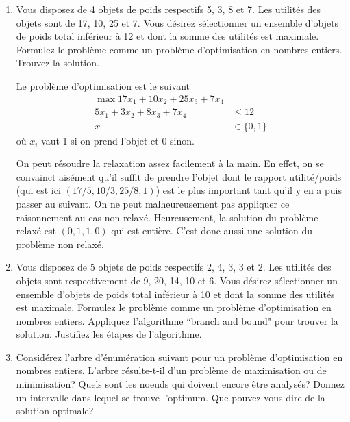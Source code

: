 \begin{enumerate}
  \item Vous disposez de 4 objets de poids respectifs 5, 3, 8 et 7. Les utilités des
    objets sont de 17, 10, 25 et 7. Vous désirez sélectionner un ensemble d'objets de poids total inférieur  à 12 et dont la somme
    des utilités est maximale.  Formulez le problème comme un problème d'optimisation en nombres entiers. Trouvez la solution.


    \begin{solution}
      Le problème d'optimisation est le suivant
      \begin{align*}
        \max 17x_1 + 10x_2 + 25x_3 + 7x_4\\
        5x_1 + 3x_2 + 8x_3 + 7x_4 & \leq 12\\
        x & \in \{0,1\}
      \end{align*}
      où $x_i$ vaut 1 si on prend l'objet et 0 sinon.

      On peut résoudre la relaxation assez facilement à la main.
      En effet, on se convainct aisément qu'il
      suffit de prendre l'objet dont le rapport utilité/poids
      (qui est ici $(17/5,10/3,25/8,1)$)
      est le plus important tant qu'il y en a puis passer au suivant.
      On ne peut malheureusement pas appliquer ce raisonnement au cas
      non relaxé.
      Heureusement, la solution du problème relaxé est $(0,1,1,0)$ qui
      est entière.
      C'est donc aussi une solution du problème non relaxé.
    \end{solution}

  \item Vous disposez de 5 objets de poids respectifs 2, 4, 3, 3 et 2. Les
    utilités des objets sont respectivement de 9, 20, 14, 10 et 6. Vous désirez
    sélectionner un ensemble d'objets de poids total inférieur  à 10
    et dont la somme des utilités est maximale.  Formulez le problème
    comme un problème d'optimisation en nombres entiers. Appliquez l'algorithme ``branch and bound" pour trouver la
    solution. Justifiez les étapes de l'algorithme.

    \begin{solution}
      \nosolution
    \end{solution}

  \item  Considérez l'arbre d'énumération suivant pour un problème d'optimisation en nombres entiers. L'arbre
    résulte-t-il d'un problème de maximisation ou de minimisation?  Quels sont les noeuds qui doivent encore être analysés? Donnez
    un intervalle dans lequel se trouve l'optimum. Que pouvez vous dire de la solution optimale?


\end{enumerate}
